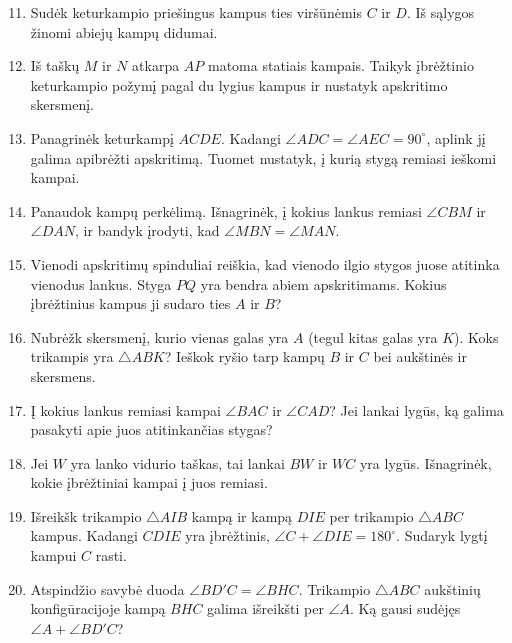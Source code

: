 \documentclass[11pt,a4paper]{scrartcl}
\begin{document}
\begin{enumerate}
    \setcounter{enumi}{10}
    \item Sudėk keturkampio priešingus kampus ties viršūnėmis $C$ ir $D$. Iš sąlygos žinomi abiejų kampų didumai.
    \item Iš taškų $M$ ir $N$ atkarpa $AP$ matoma statiais kampais. Taikyk įbrėžtinio keturkampio požymį pagal du lygius kampus ir nustatyk apskritimo skersmenį.
    \item Panagrinėk keturkampį $ACDE$. Kadangi $\angle ADC=\angle AEC=90^\circ$, aplink jį galima apibrėžti apskritimą. Tuomet nustatyk, į kurią stygą remiasi ieškomi kampai.
    \item Panaudok kampų perkėlimą. Išnagrinėk, į kokius lankus remiasi $\angle CBM$ ir $\angle DAN$, ir bandyk įrodyti, kad $\angle MBN=\angle MAN$.
    \item Vienodi apskritimų spinduliai reiškia, kad vienodo ilgio stygos juose atitinka vienodus lankus. Styga $PQ$ yra bendra abiem apskritimams. Kokius įbrėžtinius kampus ji sudaro ties $A$ ir $B$?
    \item Nubrėžk skersmenį, kurio vienas galas yra $A$ (tegul kitas galas yra $K$). Koks trikampis yra $\triangle ABK$? Ieškok ryšio tarp kampų $B$ ir $C$ bei aukštinės ir skersmens.
    \item Į kokius lankus remiasi kampai $\angle BAC$ ir $\angle CAD$? Jei lankai lygūs, ką galima pasakyti apie juos atitinkančias stygas?
    \item Jei $W$ yra lanko vidurio taškas, tai lankai $BW$ ir $WC$ yra lygūs. Išnagrinėk, kokie įbrėžtiniai kampai į juos remiasi.
    \item Išreikšk trikampio $\triangle AIB$ kampą ir kampą $DIE$ per trikampio $\triangle ABC$ kampus. Kadangi $CDIE$ yra įbrėžtinis, $\angle C+\angle DIE=180^\circ$. Sudaryk lygtį kampui $C$ rasti.
    \item Atspindžio savybė duoda $\angle BD'C=\angle BHC$. Trikampio $\triangle ABC$ aukštinių konfigūracijoje kampą $BHC$ galima išreikšti per $\angle A$. Ką gausi sudėjęs $\angle A+\angle BD'C$?
\end{enumerate}
\end{document}
